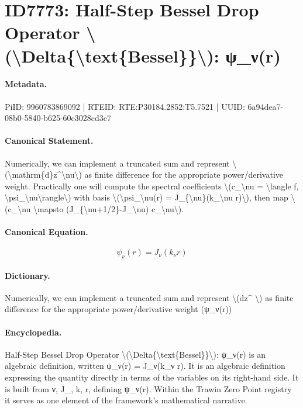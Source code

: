 \section*{ID7773: Half-Step Bessel Drop Operator \textbackslash{}(\textbackslash{}Delta\{\textbackslash{}text\{Bessel\}\}\textbackslash{}): ψ\_ν(r)}
\paragraph{Metadata.}
PiID: 9960783869092 | RTEID: RTE:P30184.2852:T5.7521 | UUID: 6a94dea7-08b0-5840-b625-60c3028cd3c7

\paragraph{Canonical Statement.}
Numerically, we can implement a truncated sum and represent \textbackslash{}(\textbackslash{}mathrm\{d\}z\textasciicircum{}\textbackslash{}nu\textbackslash{}) as finite difference for the appropriate power/derivative weight. Practically one will compute the spectral coefficients \textbackslash{}(c\_\textbackslash{}nu = \textbackslash{}langle f, \textbackslash{}psi\_\textbackslash{}nu\textbackslash{}rangle\textbackslash{}) with basis \textbackslash{}(\textbackslash{}psi\_\textbackslash{}nu(r) = J\_\{\textbackslash{}nu\}(k\_\textbackslash{}nu r)\textbackslash{}), then map \textbackslash{}(c\_\textbackslash{}nu \textbackslash{}mapsto (J\_\{\textbackslash{}nu+1/2\}-J\_\textbackslash{}nu) c\_\textbackslash{}nu\textbackslash{}).

\paragraph{Canonical Equation.}
\[
\psi_\nu(r) = J_{\nu}(k_\nu r)
\]

\paragraph{Dictionary.}
Numerically, we can implement a truncated sum and represent \textbackslash{}(dz\textasciicircum{} \textbackslash{}) as finite difference for the appropriate power/derivative weight (ψ\_ν(r))

\paragraph{Encyclopedia.}
Half-Step Bessel Drop Operator \textbackslash{}(\textbackslash{}Delta\{\textbackslash{}text\{Bessel\}\}\textbackslash{}): ψ\_ν(r) is an algebraic definition, written ψ\_ν(r) = J\_ν(k\_ν r). It is an algebraic definition expressing the quantity directly in terms of the variables on its right-hand side. It is built from ν, J\_, k, r, defining ψ\_ν(r). Within the Trawin Zero Point registry it serves as one element of the framework's mathematical narrative.
